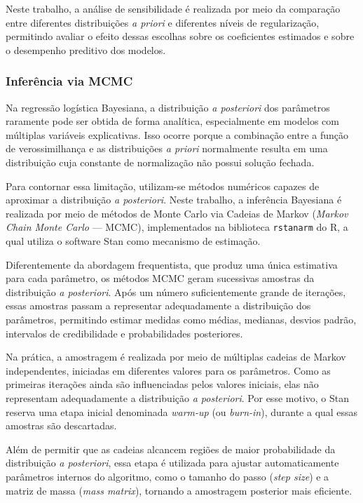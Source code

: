\documentclass[
  brazilian,
  12pt,
  letterpaper,
  DIV=11,
  numbers=noendperiod]{scrartcl}
\begin{document}
Neste trabalho, a análise de sensibilidade é realizada por meio da
comparação entre diferentes distribuições \emph{a priori} e diferentes
níveis de regularização, permitindo avaliar o efeito dessas escolhas
sobre os coeficientes estimados e sobre o desempenho preditivo dos
modelos.

\subsubsection{Inferência via MCMC}\label{inferuxeancia-via-mcmc}

Na regressão logística Bayesiana, a distribuição \emph{a posteriori} dos
parâmetros raramente pode ser obtida de forma analítica, especialmente
em modelos com múltiplas variáveis explicativas. Isso ocorre porque a
combinação entre a função de verossimilhança e as distribuições \emph{a
priori} normalmente resulta em uma distribuição cuja constante de
normalização não possui solução fechada.

Para contornar essa limitação, utilizam-se métodos numéricos capazes de
aproximar a distribuição \emph{a posteriori}. Neste trabalho, a
inferência Bayesiana é realizada por meio de métodos de Monte Carlo via
Cadeias de Markov (\emph{Markov Chain Monte Carlo} --- MCMC),
implementados na biblioteca \texttt{rstanarm} do R, a qual utiliza o
software Stan como mecanismo de estimação.

Diferentemente da abordagem frequentista, que produz uma única
estimativa para cada parâmetro, os métodos MCMC geram sucessivas
amostras da distribuição \emph{a posteriori}. Após um número
suficientemente grande de iterações, essas amostras passam a representar
adequadamente a distribuição dos parâmetros, permitindo estimar medidas
como médias, medianas, desvios padrão, intervalos de credibilidade e
probabilidades posteriores.

Na prática, a amostragem é realizada por meio de múltiplas cadeias de
Markov independentes, iniciadas em diferentes valores para os
parâmetros. Como as primeiras iterações ainda são influenciadas pelos
valores iniciais, elas não representam adequadamente a distribuição
\emph{a posteriori}. Por esse motivo, o Stan reserva uma etapa inicial
denominada \emph{warm-up} (ou \emph{burn-in}), durante a qual essas
amostras são descartadas.

Além de permitir que as cadeias alcancem regiões de maior probabilidade
da distribuição \emph{a posteriori}, essa etapa é utilizada para ajustar
automaticamente parâmetros internos do algoritmo, como o tamanho do
passo (\emph{step size}) e a matriz de massa (\emph{mass matrix}),
tornando a amostragem posterior mais eficiente.
\end{document}
